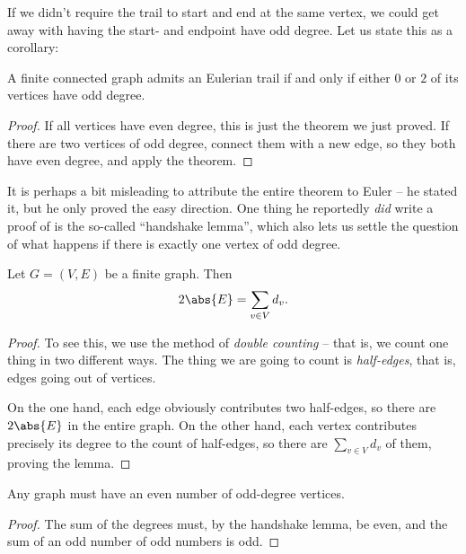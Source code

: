 \documentclass[nobib]{tufte-handout}
\begin{document}
If we didn't require the trail to start and end at the same vertex, we could get away with having the start- and endpoint have odd degree. Let us state this as a corollary:

\begin{corollary}
  A finite connected graph admits an Eulerian trail if and only if either $0$ or $2$ of its vertices have odd degree.

  \begin{proof}
    If all vertices have even degree, this is just the theorem we just proved. If there are two vertices of odd degree, connect them with a new edge, so they both have even degree, and apply the theorem.
  \end{proof}
\end{corollary}

It is perhaps a bit misleading to attribute the entire theorem to Euler -- he stated it, but he only proved the easy direction. One thing he reportedly \emph{did} write a proof of is the so-called ``handshake lemma'', which also lets us settle the question of what happens if there is exactly one vertex of odd degree.

\begin{lemma}
  Let $G = (V,E)$ be a finite graph. Then
    $$2\abs{E} = \sum_{v \in V} d_v.$$

  \begin{proof}
    To see this, we use the method of \emph{double counting} -- that is, we count one thing in two different ways. The thing we are going to count is \emph{half-edges}, that is, edges going out of vertices.

    On the one hand, each edge obviously contributes two half-edges, so there are $2\abs{E}$ in the entire graph. On the other hand, each vertex contributes precisely its degree to the count of half-edges, so there are $\sum_{v\in V} d_v$ of them, proving the lemma.
  \end{proof}
\end{lemma}

\begin{corollary}
  Any graph must have an even number of odd-degree vertices.
  \begin{proof}
    The sum of the degrees must, by the handshake lemma, be even, and the sum of an odd number of odd numbers is odd.
  \end{proof}
\end{corollary}
\end{document}
